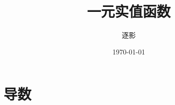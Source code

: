 \documentclass[UTF8,10pt, a4paper, oneside,scheme=plain]{ctexbook}
\author{逐影}
\title{\Huge\textbf{一元实值函数}}
\date{\today}
\begin{document}
\frontmatter
\maketitle
\tableofcontents
\mainmatter

\part{导数}


%

%

%

%

%

%

\backmatter
\end{document}
